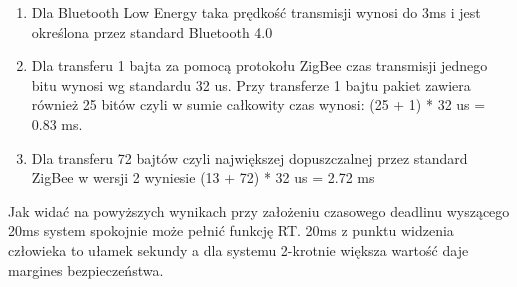 \begin{enumerate}
\item Dla Bluetooth Low Energy taka prędkość transmisji wynosi do 3ms i jest określona przez standard Bluetooth 4.0
\item Dla transferu 1 bajta za pomocą protokołu ZigBee czas transmisji jednego bitu wynosi wg standardu 32 us. Przy transferze 1 bajtu pakiet zawiera również 25 bitów czyli w sumie całkowity czas wynosi: (25 + 1) * 32 us = 0.83 ms.
\item Dla transferu 72 bajtów czyli największej dopuszczalnej przez standard ZigBee w wersji 2 wyniesie (13 + 72) * 32 us = 2.72 ms
\end{enumerate} 

\par
\tab Jak widać na powyższych wynikach przy założeniu czasowego deadlinu wyszącego 20ms system spokojnie może pełnić funkcję RT. 20ms z punktu widzenia człowieka to ułamek sekundy a dla systemu 2-krotnie większa wartość daje margines bezpieczeństwa.

\clearpage
